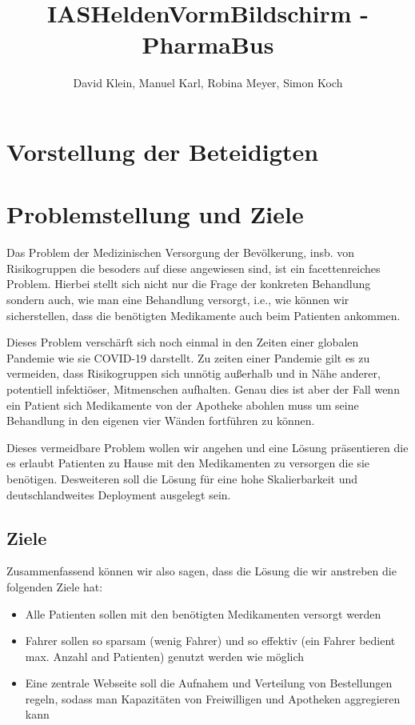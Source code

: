 \documentclass[a4]{article}
\title{IASHeldenVormBildschirm - PharmaBus}
\author{David Klein, Manuel Karl, Robina Meyer, Simon Koch}
\begin{document}
\maketitle


\section{Vorstellung der Beteidigten}


\section{Problemstellung und Ziele}

Das Problem der Medizinischen Versorgung der Bevölkerung, insb. von Risikogruppen die besoders auf diese angewiesen sind, ist ein facettenreiches Problem.
Hierbei stellt sich nicht nur die Frage der konkreten Behandlung sondern auch, wie man eine Behandlung versorgt, i.e., wie können wir sicherstellen, dass die benötigten Medikamente auch beim Patienten ankommen.

Dieses Problem verschärft sich noch einmal in den Zeiten einer globalen Pandemie wie sie COVID-19 darstellt. Zu zeiten einer Pandemie gilt es zu vermeiden, dass Risikogruppen sich unnötig außerhalb und in Nähe anderer, potentiell infektiöser, Mitmenschen aufhalten. Genau dies ist aber der Fall wenn ein Patient sich Medikamente von der Apotheke abohlen muss um seine Behandlung in den eigenen vier Wänden fortführen zu können.

Dieses vermeidbare Problem wollen wir angehen und eine Lösung präsentieren die es erlaubt Patienten zu Hause mit den Medikamenten zu versorgen die sie benötigen. Desweiteren soll die Lösung für eine hohe Skalierbarkeit und deutschlandweites Deployment ausgelegt sein.

\subsection{Ziele}

Zusammenfassend können wir also sagen, dass die Lösung die wir anstreben die folgenden Ziele hat:

\begin{itemize}
\item Alle Patienten sollen mit den benötigten Medikamenten versorgt werden
\item Fahrer sollen so sparsam (wenig Fahrer) und so effektiv (ein Fahrer bedient max. Anzahl and Patienten) genutzt werden wie möglich
\item Eine zentrale Webseite soll die Aufnahem und Verteilung von Bestellungen regeln, sodass man Kapazitäten von Freiwilligen und Apotheken aggregieren kann
\end{itemize}
\end{document}
